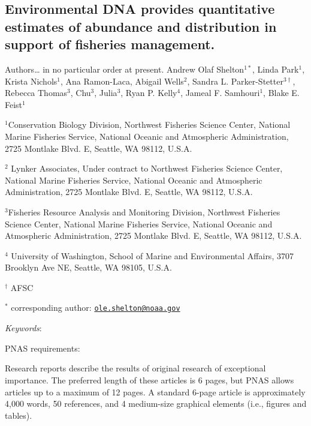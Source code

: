 \documentclass[
]{article}
\author{}
\date{\vspace{-2.5em}}
\begin{document}
\hypertarget{environmental-dna-provides-quantitative-estimates-of-abundance-and-distribution-in-support-of-fisheries-management.}{%
\subsection{Environmental DNA provides quantitative estimates of
abundance and distribution in support of fisheries
management.}\label{environmental-dna-provides-quantitative-estimates-of-abundance-and-distribution-in-support-of-fisheries-management.}}

Authors\ldots{} in no particular order at present. Andrew Olaf
Shelton\(^{1*}\), Linda Park\(^1\), Krista Nichols\(^1\), Ana
Ramon-Laca, Abigail Wells\(^2\), Sandra L.
Parker-Stetter\(^{3\dagger}\), Rebecca Thomas\(^{3}\), Chu\(^{3}\),
Julia\(^{3}\), Ryan P. Kelly\(^{4}\), Jameal F. Samhouri\(^{1}\), Blake
E. Feist\(^1\)

\(^1\)Conservation Biology Division, Northwest Fisheries Science Center,
National Marine Fisheries Service, National Oceanic and Atmospheric
Administration, 2725 Montlake Blvd. E, Seattle, WA 98112, U.S.A.

\(^2\) Lynker Associates, Under contract to Northwest Fisheries Science
Center, National Marine Fisheries Service, National Oceanic and
Atmospheric Administration, 2725 Montlake Blvd. E, Seattle, WA 98112,
U.S.A.

\(^{3}\)Fisheries Resource Analysis and Monitoring Division, Northwest
Fisheries Science Center, National Marine Fisheries Service, National
Oceanic and Atmospheric Administration, 2725 Montlake Blvd. E, Seattle,
WA 98112, U.S.A.

\(^{4}\) University of Washington, School of Marine and Environmental
Affairs, 3707 Brooklyn Ave NE, Seattle, WA 98105, U.S.A.

\(^{\dagger}\) AFSC

\(^{*}\) corresponding author:
\href{mailto:ole.shelton@noaa.gov}{\nolinkurl{ole.shelton@noaa.gov}}

\emph{Keywords}:

\pagebreak

PNAS requirements:

Research reports describe the results of original research of
exceptional importance. The preferred length of these articles is 6
pages, but PNAS allows articles up to a maximum of 12 pages. A standard
6-page article is approximately 4,000 words, 50 references, and 4
medium-size graphical elements (i.e., figures and tables).
\end{document}
